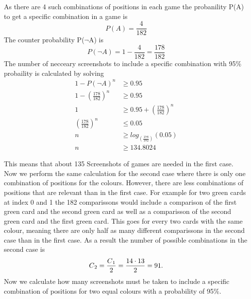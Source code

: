\begin{center}
	As there are 4 such combinations of positions in each game the probanility P(A) to get a specific combination in a game is 
	\begin{equation*}
	P(A) = \frac{4}{182} %
	\end{equation*}
	The counter probability P($\lnot$A) is 
	\begin{equation*}
	P(\lnot A) = 1 - \frac{4}{182} = \frac{178}{182}%
	\end{equation*}
	The number of necceary screenshots to include a specific combination with 95\% probaility is calculated by solving
	\begin{align*}
	1 - P(\lnot A)^n &\geq 0.95 \\
	1 - \left(\frac{178}{182}\right)^n &\geq 0.95 \\
	1 &\geq 0.95 + \left(\frac{178}{182}\right)^n\\
	\left(\frac{178}{182}\right)^n &\leq 0.05\\
	n &\geq log_{(\frac{178}{182})}(0.05) \\
	n &\geq 134.8024 %
	\end{align*}
\end{center}
This means that about 135 Screenshots of games are needed in the first case. Now we perform the same calculation for the second case where there is only one combination of positions for the colours. However, there are less combinations of positions that are relevant than in the first case. For example for two green cards at index 0 and 1 the 182 comparissons would include a comparison of the first green card and the second green card as well as a comparisson of the second green card and the first green card. This goes for every two cards with the same colour, meaning there are only half as many different comparissons in the second case than in the first case. As a result the number of possible combinations in the second case is
\begin{equation*}
C\textsubscript{2} = \frac{C\textsubscript{1}}{2} = \frac{14 \cdot 13}{2} = 91.
\end{equation*}
Now we calculate how many screenshots must be taken to include a specific combination of positions for two equal colours with a probability of 95\%. 
